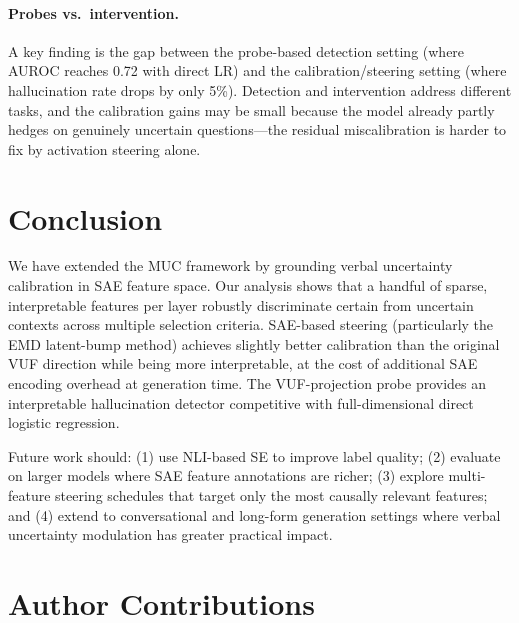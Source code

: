 \documentclass{article}
\begin{document}
\paragraph{Probes vs.\ intervention.}
A key finding is the gap between the probe-based detection setting (where
AUROC reaches 0.72 with direct LR) and the calibration/steering setting (where
hallucination rate drops by only 5\%).  Detection and intervention address
different tasks, and the calibration gains may be small because the model
already partly hedges on genuinely uncertain questions---the residual
miscalibration is harder to fix by activation steering alone.

\section{Conclusion}
\label{sec:conclusion}

We have extended the MUC framework by grounding verbal uncertainty calibration
in SAE feature space.  Our analysis shows that a handful of sparse,
interpretable features per layer robustly discriminate certain from uncertain
contexts across multiple selection criteria.  SAE-based steering (particularly
the EMD latent-bump method) achieves slightly better calibration than the
original VUF direction while being more interpretable, at the cost of
additional SAE encoding overhead at generation time.  The VUF-projection probe
provides an interpretable hallucination detector competitive with
full-dimensional direct logistic regression.

Future work should: (1) use NLI-based SE to improve label quality;
(2) evaluate on larger models where SAE feature annotations are richer;
(3) explore multi-feature steering schedules that target only the most
causally relevant features; and (4) extend to conversational and
long-form generation settings where verbal uncertainty modulation has
greater practical impact.




\appendix

\section*{Author Contributions}
\label{sec:contributions}
\end{document}

